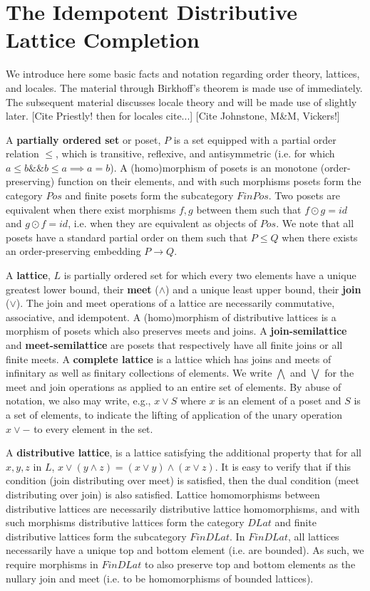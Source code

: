 \documentclass[hoptionsi,review,format=sigplan]{acmart}
\theoremstyle{definition}
\begin{document}
\section{The Idempotent Distributive Lattice Completion}

We introduce here some basic facts and notation regarding order theory, lattices, and locales. The material through Birkhoff's theorem is made use of immediately. The subsequent material discusses locale theory and will be made use of slightly later. [Cite Priestly! then for locales cite...]  [Cite Johnstone, M\&M, Vickers!]

A \textbf{partially ordered set} or poset, \(P\) is a set equipped with a partial order relation \(\le\), which is transitive,  reflexive, and antisymmetric (i.e. for which \( a \le b \mathbin{\&\&} b \le a \implies a = b\)). A (homo)morphism of posets is an monotone (order-preserving) function on their elements, and with such morphisms posets form the category \(Pos\) and finite posets form the subcategory \(FinPos\). Two posets are equivalent when there exist morphisms \(f, g\) between them such that \(f \odot g = id\) and \(g \odot f = id\), i.e. when they are equivalent as objects of \(Pos\). We note that all posets have a standard partial order on them such that \(P \le Q\) when there exists an order-preserving embedding \(P \rightarrow Q\).

A \textbf{lattice}, \(L\) is partially ordered set for which every two elements have a unique greatest lower bound, their \textbf{meet} (\(\wedge\)) and a unique least upper bound, their \textbf{join} (\(\vee\)). The join and meet operations of a lattice are necessarily commutative, associative, and idempotent. A (homo)morphism of distributive lattices is a morphism of posets which also preserves meets and joins. A \textbf{join-semilattice} and \textbf{meet-semilattice} are posets that respectively have all finite joins or all finite meets. A \textbf{complete lattice} is a lattice which has joins and meets of infinitary as well as finitary collections of elements. We write \(\bigwedge\) and \(\bigvee\) for the meet and join operations as applied to an entire set of elements. By abuse of notation, we also may write, e.g., \(x \vee S\) where \(x\) is an element of a poset and \(S\) is a set of elements, to indicate the lifting of application of the unary operation \(x \vee -\) to every element in the set.

A \textbf{distributive lattice}, is a lattice satisfying the additional property that for all \(x, y, z\) in \(L\), \(x \vee (y \wedge z) = (x \vee y) \wedge (x \vee z)\). It is easy to verify that if this condition (join distributing over meet) is satisfied, then the dual condition (meet distributing over join) is also satisfied.  Lattice homomorphisms between distributive lattices are necessarily distributive lattice homomorphisms, and with such morphisms distributive lattices form the category \(DLat\) and finite distributive lattices form the subcategory \(FinDLat\). In \(FinDLat\), all lattices necessarily have a unique top and bottom element (i.e. are bounded). As such, we require morphisms in \(FinDLat\) to also preserve top and bottom elements as the nullary join and meet (i.e. to be homomorphisms of bounded lattices).
\end{document}
